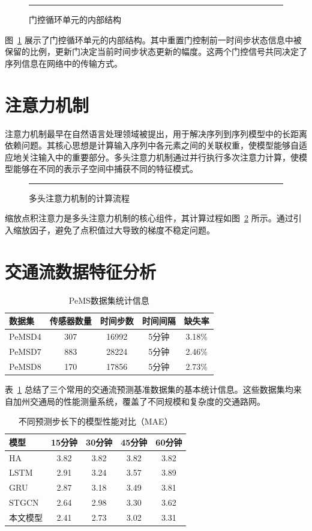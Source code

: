 \documentclass[12pt,a4paper,twoside]{ctexbook}
\begin{document}
\begin{figure}[htbp]
\centering
\rule{0.65\textwidth}{3.5cm}
\caption{门控循环单元的内部结构}
\label{fig:gru}
\end{figure}

图~\ref{fig:gru} 展示了门控循环单元的内部结构。其中重置门控制前一时间步状态信息中被保留的比例，更新门决定当前时间步状态更新的幅度。这两个门控信号共同决定了序列信息在网络中的传输方式。

\section{注意力机制}
注意力机制最早在自然语言处理领域被提出，用于解决序列到序列模型中的长距离依赖问题。其核心思想是计算输入序列中各元素之间的关联权重，使模型能够自适应地关注输入中的重要部分。多头注意力机制通过并行执行多次注意力计算，使模型能够在不同的表示子空间中捕获不同的特征模式。

\begin{figure}[htbp]
\centering
\rule{0.7\textwidth}{3cm}
\caption{多头注意力机制的计算流程}
\label{fig:attention}
\end{figure}

缩放点积注意力是多头注意力机制的核心组件，其计算过程如图~\ref{fig:attention} 所示。通过引入缩放因子，避免了点积值过大导致的梯度不稳定问题。

\section{交通流数据特征分析}
\begin{table}[htbp]
\centering
\caption{PeMS数据集统计信息}
\label{tab:dataset}
\begin{tabular}{lcccc}
\toprule
数据集 & 传感器数量 & 时间步数 & 时间间隔 & 缺失率 \\
\midrule
PeMSD4 & 307 & 16992 & 5分钟 & 3.18\% \\
PeMSD7 & 883 & 28224 & 5分钟 & 2.46\% \\
PeMSD8 & 170 & 17856 & 5分钟 & 2.73\% \\
\bottomrule
\end{tabular}
\end{table}

表~\ref{tab:dataset} 总结了三个常用的交通流预测基准数据集的基本统计信息。这些数据集均来自加州交通局的性能测量系统，覆盖了不同规模和复杂度的交通路网。

\begin{table}[htbp]
\centering
\caption{不同预测步长下的模型性能对比（MAE）}
\label{tab:performance}
\begin{tabular}{lcccc}
\toprule
模型 & 15分钟 & 30分钟 & 45分钟 & 60分钟 \\
\midrule
HA & 3.82 & 3.82 & 3.82 & 3.82 \\
LSTM & 2.91 & 3.24 & 3.57 & 3.89 \\
GRU & 2.87 & 3.18 & 3.49 & 3.81 \\
STGCN & 2.64 & 2.98 & 3.30 & 3.62 \\
本文模型 & 2.41 & 2.73 & 3.02 & 3.31 \\
\bottomrule
\end{tabular}
\end{table}
\end{document}
